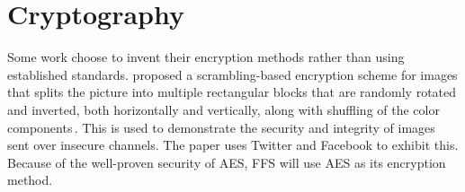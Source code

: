 \section{Cryptography}
\label{sec:rel_crypto}
Some work choose to invent their encryption methods rather than using established standards. \citeauthor{chumanEncryptionThenCompressionSystemsUsing2019} proposed a \mbox{scrambling-based} encryption scheme for images that splits the picture into multiple rectangular blocks that are randomly rotated and inverted, both horizontally and vertically, along with shuffling of the color components\,\cite{chumanEncryptionThenCompressionSystemsUsing2019}. This is used to demonstrate the security and integrity of images sent over insecure channels. The paper uses Twitter and Facebook to exhibit this. Because of the \mbox{well-proven} security of \gls{AES}, \gls{FFS} will use \gls{AES} as its encryption method.